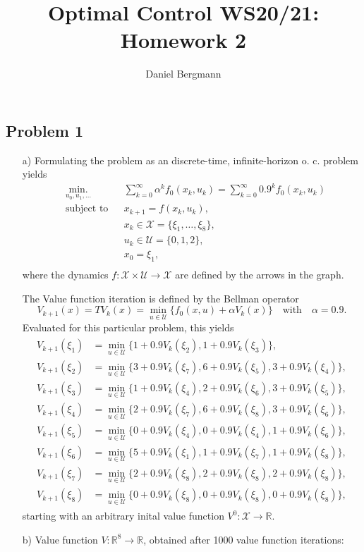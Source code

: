 \documentclass[]{article}
\title{Optimal Control WS20/21: Homework 2}
\author{Daniel Bergmann}
\newcommand{\xk}{x_k}
\newcommand{\uk}{u_k}
\newcommand{\xnull}{x_0}
\newcommand{\xkplus}{x_{k+1}}
\newcommand{\R}{\mathbb{R}}
\newcommand{\fnull}{f_0}
\newcommand{\X}{\mathcal{X}}
\newcommand{\U}{\mathcal{U}}
\newcommand{\writeset}[1]{\{#1\}}
\newcommand{\Vk}{V_k}
\newcommand{\Vind}[1]{V^#1}
\newcommand{\Vnull}{\Vind{0}}
\newcommand{\Vkplus}{V_{k+1}}
\newcommand{\minVit}[6]{\min_{u \in \U} \writeset{#1+0.9\Vk(\xi_{#2}), #3+0.9\Vk(\xi_{#4}),#5+0.9\Vk(\xi_#6) }}
\begin{document}
\maketitle

\subsection*{Problem 1}
		\begin{enumerate}
			\item[a)] Formulating the problem as an discrete-time, infinite-horizon o. c. problem yields
				\begin{equation}
				\begin{aligned}
				& \underset{u_0,u_1,\dots}{\text{min.}}
				& & \sum_{k=0}^{\infty}\alpha^k \fnull(\xk,\uk) = \sum_{k=0}^{\infty}  0.9^k \fnull(\xk,\uk)\\
				& \text{subject to}
				& & \xkplus = f(\xk,\uk),\\
				& & & \xk \in \X = \writeset{\xi_1,\dots,\xi_8},\\
				& & & \uk \in \U = \writeset{0,1,2},\\
				& & &\xnull = \xi_1,\\ 
				\end{aligned}
				\end{equation}
				where the dynamics $ f: \X \times \U \longrightarrow \X $ are defined by the arrows in the graph.
				
				The Value function iteration is defined by the Bellman operator
				\begin{equation} \label{eq:BellmanOp}
					\Vkplus(x) = T\Vk(x) = \underset{u \in \U}{\min} \writeset{\fnull(x,u) + \alpha \Vk(x)}  \quad \text{with} \quad \alpha= 0.9.
				\end{equation}
				Evaluated for this particular problem, this yields
				\begin{align}
					\begin{split}
						\Vkplus(\xi_1) &= \min_{u \in \U} \writeset{1+0.9 \Vk(\xi_2),1+0.9\Vk(\xi_3)},\\
						\Vkplus(\xi_2) &= \min_{u \in \U} \writeset{3+0.9 \Vk(\xi_7),6+0.9\Vk(\xi_5),3+0.9\Vk(\xi_4)},\\
						\Vkplus(\xi_3) &= \min_{u \in \U} \writeset{1+0.9\Vk(\xi_4), 2+0.9\Vk(\xi_6),3+0.9\Vk(\xi_5) },\\
						\Vkplus(\xi_4) &= \minVit{2}{7}{6}{8}{3}{6},\\
						\Vkplus(\xi_5) &= \minVit{0}{4}{0}{4}{1}{6},\\
						\Vkplus(\xi_6) &= \minVit{5}{1}{1}{7}{1}{8},\\
						\Vkplus(\xi_7) &= \minVit{2}{8}{2}{8}{2}{8},\\
						\Vkplus(\xi_8) &= \minVit{0}{8}{0}{8}{0}{8},
					\end{split}
				\end{align}
				starting with an arbitrary inital value function $ \Vnull: \X \longrightarrow \R $.
			\item[b)]
				Value function $ V:\R^8 \longrightarrow \R $, obtained after 1000 value function iterations:\\
				

\end{enumerate}
\end{document}
